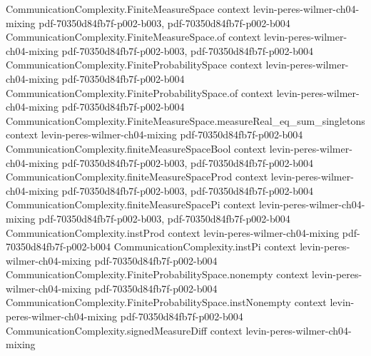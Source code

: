 \begin{theorem}
\label{CommunicationComplexity.TVDistance.tvDistance_eq_half_sum}
\leanok
{}
\proofstep
  {CommunicationComplexity.FiniteMeasureSpace}
  {context}
  {levin-peres-wilmer-ch04-mixing}
  {pdf-70350d84fb7f-p002-b003,
    pdf-70350d84fb7f-p002-b004}
\proofstep
  {CommunicationComplexity.FiniteMeasureSpace.of}
  {context}
  {levin-peres-wilmer-ch04-mixing}
  {pdf-70350d84fb7f-p002-b003,
    pdf-70350d84fb7f-p002-b004}
\proofstep
  {CommunicationComplexity.FiniteProbabilitySpace}
  {context}
  {levin-peres-wilmer-ch04-mixing}
  {pdf-70350d84fb7f-p002-b004}
\proofstep
  {CommunicationComplexity.FiniteProbabilitySpace.of}
  {context}
  {levin-peres-wilmer-ch04-mixing}
  {pdf-70350d84fb7f-p002-b004}
\proofstep
  {CommunicationComplexity.FiniteMeasureSpace.measureReal_eq_sum_singletons}
  {context}
  {levin-peres-wilmer-ch04-mixing}
  {pdf-70350d84fb7f-p002-b004}
\proofstep
  {CommunicationComplexity.finiteMeasureSpaceBool}
  {context}
  {levin-peres-wilmer-ch04-mixing}
  {pdf-70350d84fb7f-p002-b003,
    pdf-70350d84fb7f-p002-b004}
\proofstep
  {CommunicationComplexity.finiteMeasureSpaceProd}
  {context}
  {levin-peres-wilmer-ch04-mixing}
  {pdf-70350d84fb7f-p002-b003,
    pdf-70350d84fb7f-p002-b004}
\proofstep
  {CommunicationComplexity.finiteMeasureSpacePi}
  {context}
  {levin-peres-wilmer-ch04-mixing}
  {pdf-70350d84fb7f-p002-b003,
    pdf-70350d84fb7f-p002-b004}
\proofstep
  {CommunicationComplexity.instProd}
  {context}
  {levin-peres-wilmer-ch04-mixing}
  {pdf-70350d84fb7f-p002-b004}
\proofstep
  {CommunicationComplexity.instPi}
  {context}
  {levin-peres-wilmer-ch04-mixing}
  {pdf-70350d84fb7f-p002-b004}
\proofstep
  {CommunicationComplexity.FiniteProbabilitySpace.nonempty}
  {context}
  {levin-peres-wilmer-ch04-mixing}
  {pdf-70350d84fb7f-p002-b004}
\proofstep
  {CommunicationComplexity.FiniteProbabilitySpace.instNonempty}
  {context}
  {levin-peres-wilmer-ch04-mixing}
  {pdf-70350d84fb7f-p002-b004}
\proofstep
  {CommunicationComplexity.signedMeasureDiff}
  {context}
  {levin-peres-wilmer-ch04-mixing}

\end{theorem}
